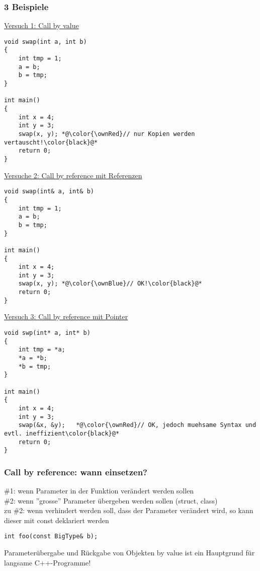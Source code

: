 \subsubsection{3 Beispiele\hfill}
\label{sec:unterunterabschnitt}
\underline{Versuch 1: Call by value}
\noindent
\begin{minipage}{\linewidth}
\begin{lstlisting}
void swap(int a, int b)
{
	int tmp = 1;
	a = b;
	b = tmp;
}

int main()
{
	int x = 4;
	int y = 3;
	swap(x, y);	*@\color{\ownRed}// nur Kopien werden vertauscht!\color{black}@*
	return 0;
}
\end{lstlisting}
\end{minipage}
\underline{Versuche 2: Call by reference mit Referenzen}
\noindent
\begin{minipage}{\linewidth}
\begin{lstlisting}
void swap(int& a, int& b)
{
	int tmp = 1;
	a = b;
	b = tmp;
}

int main()
{
	int x = 4;
	int y = 3;
	swap(x, y);	*@\color{\ownBlue}// OK!\color{black}@*
	return 0;
}
\end{lstlisting}
\end{minipage}
\underline{Versuch 3: Call by reference mit Pointer}
\noindent
\begin{minipage}{\linewidth}
\begin{lstlisting}
void swp(int* a, int* b)
{
	int tmp = *a;
	*a = *b;
	*b = tmp;
}

int main()
{
	int x = 4;
	int y = 3;
	swap(&x, &y);	*@\color{\ownRed}// OK, jedoch muehsame Syntax und evtl. ineffizient\color{black}@*
	return 0;
}
\end{lstlisting}
\end{minipage}

\subsubsection{Call by reference: wann einsetzen?\hfill}
\label{sec:unterunterabschnitt}
\#1: wenn Parameter in der Funktion verändert werden sollen\\
\#2: wenn ''grosse'' Parameter übergeben werden sollen (struct, class)\\
zu \#2: wenn verhindert werden soll, dass der Parameter verändert wird, so kann dieser mit const deklariert werden\\
\noindent
\begin{minipage}{\linewidth}
\begin{lstlisting}
int foo(const BigType& b);
\end{lstlisting}
\end{minipage}
\begin{achtung}
Parameterübergabe und Rückgabe von Objekten by value ist ein Hauptgrund für langsame C++-Programme!
\end{achtung}

